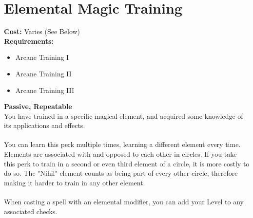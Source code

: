\section*{Elemental Magic Training}
\textbf{Cost:} Varies (See Below)\\
\textbf{Requirements:} \\
\begin{itemize}
	\item Arcane Training I
	\item Arcane Training II
	\item Arcane Training III
\end{itemize}
\textbf{Passive, Repeatable}\\
You have trained in a specific magical element, and acquired some knowledge of its applications and effects.\\
\\
You can learn this perk multiple times, learning a different element every time. Elements are associated with and opposed to each other in circles. If you take this perk to train in a second or even third element of a circle, it is more costly to do so. The "Nihil" element counts as being part of every other circle, therefore making it harder to train in any other element.\\
\\
When casting a spell with an elemental modifier, you can add your Level to any associated checks.

